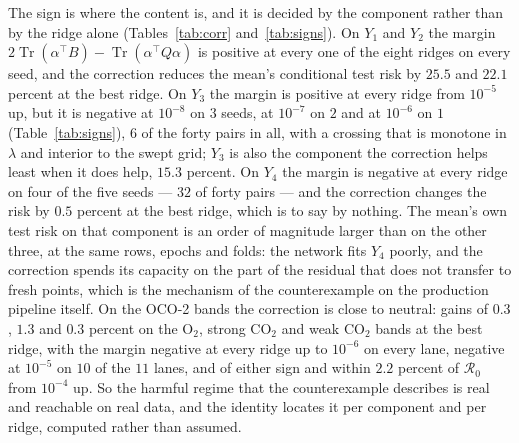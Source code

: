 \documentclass[11pt]{article}
\theoremstyle{definition}
\DeclareMathOperator{\Tr}{Tr}
\newcommand{\numGainemitYFour}{0.5}
\newcommand{\numGainemitYOne}{25.5}
\newcommand{\numGainemitYThree}{15.3}
\newcommand{\numGainemitYTwo}{22.1}
\newcommand{\numGainocoTwooTwo}{0.3}
\newcommand{\numGainocoTwoscoTwo}{1.3}
\newcommand{\numGainocoTwowcoTwo}{0.3}
\newcommand{\numHurtemitYFour}{32}
\newcommand{\numHurtemitYThree}{6}
\newcommand{\numOcoLanes}{11}
\newcommand{\numOcoMarginMaxFour}{2.2}
\newcommand{\numOcoNegFive}{10}
\newcommand{\numYthreeNegA}{3}
\newcommand{\numYthreeNegB}{2}
\newcommand{\numYthreeNegC}{1}
\begin{document}
The sign is where the content is, and it is decided by the component rather than by the ridge alone
(Tables~\ref{tab:corr} and~\ref{tab:signs}). On $Y_1$ and $Y_2$ the margin
$2\Tr(\alpha^\top B)-\Tr(\alpha^\top Q\alpha)$ is positive at every one of the eight ridges on every
seed, and the correction reduces the mean's conditional test risk by $\numGainemitYOne$ and
$\numGainemitYTwo$ percent at the best ridge. On $Y_3$ the margin is positive at every ridge from
$10^{-5}$ up, but it is negative at $10^{-8}$ on $\numYthreeNegA$ seeds, at $10^{-7}$ on
$\numYthreeNegB$ and at $10^{-6}$ on $\numYthreeNegC$ (Table~\ref{tab:signs}),
$\numHurtemitYThree$ of the forty pairs in all, with a crossing that is monotone in $\lambda$ and
interior to the swept grid; $Y_3$ is also the component the correction helps least when it does help,
$\numGainemitYThree$ percent. On $Y_4$ the margin is negative at every ridge on four of the five
seeds --- $\numHurtemitYFour$ of forty pairs --- and the correction changes the risk by
$\numGainemitYFour$ percent at the best ridge, which is to say by nothing. The mean's own test risk
on that component is an order of magnitude larger than on the other three, at the same rows, epochs
and folds: the network fits $Y_4$ poorly, and the correction spends its capacity on the part of the
residual that does not transfer to fresh points, which is the mechanism of the counterexample on the
production pipeline itself. On the OCO-2 bands the correction is close to neutral: gains of
$\numGainocoTwooTwo$, $\numGainocoTwoscoTwo$ and $\numGainocoTwowcoTwo$ percent on the O$_2$, strong
CO$_2$ and weak CO$_2$ bands at the best ridge, with the margin negative at every ridge up to
$10^{-6}$ on every lane, negative at $10^{-5}$ on $\numOcoNegFive$ of the $\numOcoLanes$ lanes,
and of either sign and within $\numOcoMarginMaxFour$ percent of $\mathcal R_0$ from $10^{-4}$ up.
So the harmful regime that the counterexample
describes is real and reachable on real data, and the identity locates it per component and per
ridge, computed rather than assumed.
\end{document}
